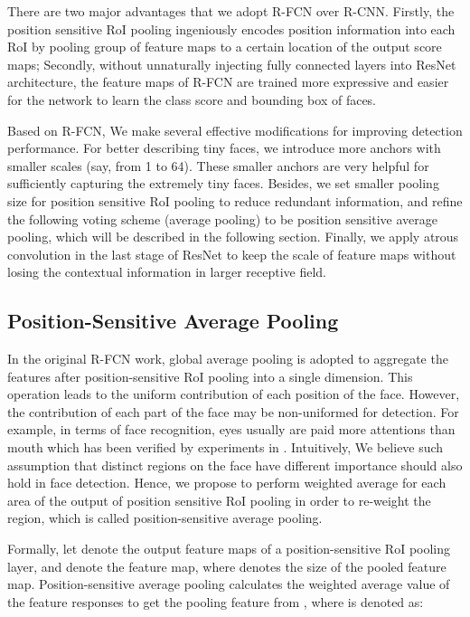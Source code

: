 \documentclass{article} \usepackage{nips13submit_e,times}
\newcommand{\ignore}[1]{}
\begin{document}
There are two major advantages that we adopt R-FCN over R-CNN. Firstly, the position sensitive RoI pooling ingeniously encodes position information into each RoI by pooling group of feature maps to a certain location of the output score maps; Secondly, without unnaturally injecting fully connected layers into ResNet architecture, the feature maps of R-FCN are trained more expressive and easier for the network to learn the class score and bounding box of faces. 

Based on R-FCN, We make several effective modifications for improving detection performance. For better describing tiny faces, we introduce more anchors with smaller scales (say, from 1 to 64). These smaller anchors are very helpful for sufficiently capturing the extremely tiny faces. Besides, we set smaller pooling size for position sensitive RoI pooling to reduce redundant information, and refine the following voting scheme (average pooling) to be position sensitive average pooling, which will be described in the following section. Finally, we apply atrous convolution in the last stage of ResNet to keep the scale of feature maps without losing the contextual information in larger receptive field\ignore{large receptive field}. 





\subsection{Position-Sensitive Average Pooling}

In the original R-FCN work, global average pooling is adopted to aggregate the features after position-sensitive RoI pooling into a single dimension. This operation leads to the uniform\ignore{equal} contribution of each position of the face. However, the contribution of each part of the face may be non-uniformed\ignore{not equal} for detection. For example, in terms of face recognition, eyes usually are paid more attentions than mouth which has been verified by experiments in \cite{ARdatabase}. 
Intuitively, We believe such assumption that distinct regions on the face have different importance should also hold in face detection. Hence, we propose to perform weighted average for each area of the output of position sensitive RoI pooling in order to re-weight the region, which is called position-sensitive average pooling. 


Formally, let  denote the output  feature maps of a position-sensitive RoI pooling layer, and  denote the  feature map, where  denotes the size of the pooled feature map. Position-sensitive average pooling calculates the weighted average value of the feature responses to get the pooling feature  from , where  is denoted as:
\end{document}
